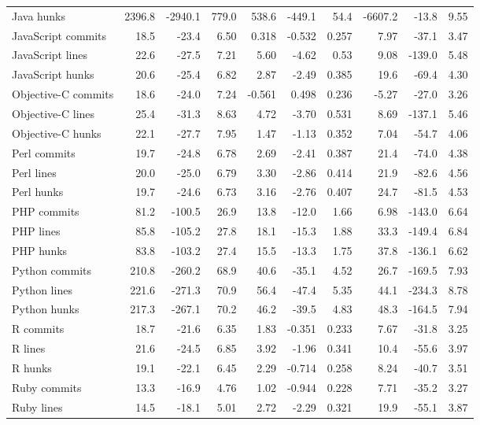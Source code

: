 \documentclass[10pt,journal,compsoc]{IEEEtran}
\begin{document}
\begin{table*}[t!]
\begin{center}
\begin{tabular}{l | *{3}{d{3.4}} | *{3}{d{3.4}} | d{4.5} *{2}{d{3.4}} }
Java hunks & 2396.8 & -2940.1 & 779.0 & 538.6 & -449.1 & 54.4 & -6607.2 & -13.8 & 9.55 \\
JavaScript commits & 18.5 & -23.4 & 6.50 & 0.318 & -0.532 & 0.257 & 7.97 & -37.1 & 3.47 \\
JavaScript lines & 22.6 & -27.5 & 7.21 & 5.60 & -4.62 & 0.53 & 9.08 & -139.0 & 5.48 \\
JavaScript hunks & 20.6 & -25.4 & 6.82 & 2.87 & -2.49 & 0.385 & 19.6 & -69.4 & 4.30 \\ \hdashline
Objective-C commits & 18.6 & -24.0 & 7.24 & -0.561 & 0.498 & 0.236 & -5.27 & -27.0 & 3.26 \\
Objective-C lines & 25.4 & -31.3 & 8.63 & 4.72 & -3.70 & 0.531 & 8.69 & -137.1 & 5.46 \\
Objective-C hunks & 22.1 & -27.7 & 7.95 & 1.47 & -1.13 & 0.352 & 7.04 & -54.7 & 4.06 \\ \hdashline
Perl commits & 19.7 & -24.8 & 6.78 & 2.69 & -2.41 & 0.387 & 21.4 & -74.0 & 4.38 \\
Perl lines & 20.0 & -25.0 & 6.79 & 3.30 & -2.86 & 0.414 & 21.9 & -82.6 & 4.56 \\
Perl hunks & 19.7 & -24.6 & 6.73 & 3.16 & -2.76 & 0.407 & 24.7 & -81.5 & 4.53 \\ \hdashline
PHP commits & 81.2 & -100.5 & 26.9 & 13.8 & -12.0 & 1.66 & 6.98 & -143.0 & 6.64 \\
PHP lines & 85.8 & -105.2 & 27.8 & 18.1 & -15.3 & 1.88 & 33.3 & -149.4 & 6.84 \\
PHP hunks & 83.8 & -103.2 & 27.4 & 15.5 & -13.3 & 1.75 & 37.8 & -136.1 & 6.62 \\ \hdashline
Python commits & 210.8 & -260.2 & 68.9 & 40.6 & -35.1 & 4.52 & 26.7 & -169.5 & 7.93 \\
Python lines & 221.6 & -271.3 & 70.9 & 56.4 & -47.4 & 5.35 & 44.1 & -234.3 & 8.78 \\
Python hunks & 217.3 & -267.1 & 70.2 & 46.2 & -39.5 & 4.83 & 48.3 & -164.5 & 7.94 \\ \hdashline
R commits & 18.7 & -21.6 & 6.35 & 1.83 & -0.351 & 0.233 & 7.67 & -31.8 & 3.25 \\
R lines & 21.6 & -24.5 & 6.85 & 3.92 & -1.96 & 0.341 & 10.4 & -55.6 & 3.97 \\
R hunks & 19.1 & -22.1 & 6.45 & 2.29 & -0.714 & 0.258 & 8.24 & -40.7 & 3.51 \\ \hdashline
Ruby commits & 13.3 & -16.9 & 4.76 & 1.02 & -0.944 & 0.228 & 7.71 & -35.2 & 3.27 \\
Ruby lines & 14.5 & -18.1 & 5.01 & 2.72 & -2.29 & 0.321 & 19.9 & -55.1 & 3.87 \\

\end{tabular}
\end{center}
\end{table*}
\end{document}
